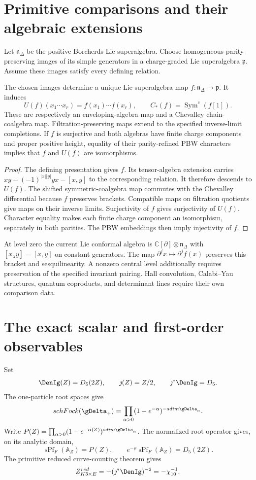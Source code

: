 \section{Primitive comparisons and their algebraic extensions}
Let $\mathfrak n_\Delta$ be the positive Borcherds Lie superalgebra.
Choose homogeneous parity-preserving images of its simple generators
in a charge-graded Lie superalgebra $\mathfrak p$.
Assume these images satisfy every defining relation.

\begin{theorem}\label{cyiv:primitive-comparison}
The chosen images determine a unique Lie-superalgebra map
$f:\mathfrak n_\Delta\to\mathfrak p$.
It induces
\[
 U(f)(x_1\cdots x_r)=f(x_1)\cdots f(x_r),
 \qquad C_*(f)=\operatorname{Sym}^c(f[1]).
\]
These are respectively an enveloping-algebra map and a Chevalley
chain-coalgebra map.
Filtration-preserving maps extend to the specified inverse-limit
completions.
If $f$ is surjective and both algebras have finite charge components
and proper positive height, equality of their parity-refined PBW
characters implies that $f$ and $U(f)$ are isomorphisms.
\end{theorem}
\begin{proof}
The defining presentation gives $f$.
Its tensor-algebra extension carries
$xy-(-1)^{|x||y|}yx-[x,y]$ to the corresponding relation.
It therefore descends to $U(f)$.
The shifted symmetric-coalgebra map commutes with the Chevalley
differential because $f$ preserves brackets.
Compatible maps on filtration quotients give maps on their inverse limits.
Surjectivity of $f$ gives surjectivity of $U(f)$.
Character equality makes each finite charge component an isomorphism,
separately in both parities.
The PBW embeddings then imply injectivity of $f$.
\end{proof}

At level zero the current Lie conformal algebra is
$\mathbb C[\partial]\otimes\mathfrak n_\Delta$ with
$[x_\lambda y]=[x,y]$ on constant generators.
The map $\partial^j x\mapsto\partial^j f(x)$ preserves this bracket
and sesquilinearity.
A nonzero central level additionally requires preservation of the
specified invariant pairing.
Hall convolution, Calabi--Yau structures, quantum coproducts, and
determinant lines require their own comparison data.

\section{The exact scalar and first-order observables}
Set
\[
 \DenIg(Z)=D_5(2Z),
 \qquad \jmath(Z)=Z/2,
 \qquad \jmath^*\DenIg=D_5.
\]
The one-particle root spaces give
\[
 \sch\Fock(\gDelta_+)
 =\prod_{\alpha>0}(1-e^{-\alpha})^{-\sdim\gDelta_\alpha}.
\]
Write $P(Z)=\prod_{\alpha>0}(1-e^{-\alpha(Z)})^{\sdim\gDelta_\alpha}$.
The normalized root operator gives, on its analytic domain,
\[
 \operatorname{sPf}_F(\mathbb A_Z)=P(Z),\qquad
 e^{-\rho}\operatorname{sPf}_F(\mathbb A_Z)=D_5(2Z).
\]
The primitive reduced curve-counting theorem gives
\[
 \mathcal Z^{\red}_{K3\times E}=-(\jmath^*\DenIg)^{-2}=-\chi_{10}^{-1}.
\]

